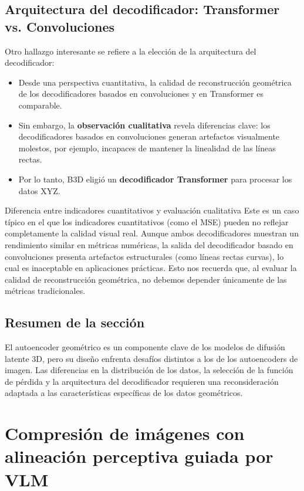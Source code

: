 \documentclass[a4paper]{article}
\begin{document}
\subsection{Arquitectura del decodificador: Transformer vs. Convoluciones}

Otro hallazgo interesante se refiere a la elección de la arquitectura del decodificador:

\begin{itemize}
    \item Desde una perspectiva cuantitativa, la calidad de reconstrucción geométrica de los decodificadores basados en convoluciones y en Transformer es comparable.
    \item Sin embargo, la \textbf{observación cualitativa} revela diferencias clave: los decodificadores basados en convoluciones generan artefactos visualmente molestos, por ejemplo, incapaces de mantener la linealidad de las líneas rectas.
    \item Por lo tanto, B3D eligió un \textbf{decodificador Transformer} para procesar los datos XYZ.
\end{itemize}

\begin{warningbox}{Diferencia entre indicadores cuantitativos y evaluación cualitativa}
Este es un caso típico en el que los indicadores cuantitativos (como el MSE) pueden no reflejar completamente la calidad visual real. Aunque ambos decodificadores muestran un rendimiento similar en métricas numéricas, la salida del decodificador basado en convoluciones presenta artefactos estructurales (como líneas rectas curvas), lo cual es inaceptable en aplicaciones prácticas. Esto nos recuerda que, al evaluar la calidad de reconstrucción geométrica, no debemos depender únicamente de las métricas tradicionales.
\end{warningbox}

\subsection{Resumen de la sección}

El autoencoder geométrico es un componente clave de los modelos de difusión latente 3D, pero su diseño enfrenta desafíos distintos a los de los autoencoders de imagen. Las diferencias en la distribución de los datos, la selección de la función de pérdida y la arquitectura del decodificador requieren una reconsideración adaptada a las características específicas de los datos geométricos.
\section{Compresión de imágenes con alineación perceptiva guiada por VLM}
\end{document}
